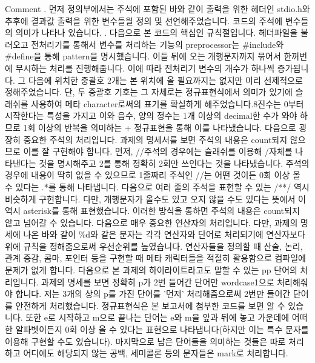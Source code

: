 \documentclass{article}
\begin{document}
Comment
. 먼저 정의부에서는 주석에 포함된 바와 같이 출력을 위한 헤더인 stdio.h와 추후에 결과값 출력을 위한 변수들읠 정의 및 선언해주었습니다. 코드의 주석에 변수들의 의미가 나타나 있습니다.
. 다음으로 본 코드의 핵심인 규칙절입니다. 헤더파일을 불러오고 전처리기를 통해서 변수를  처리하는 기능의 preprocessor는 #include와 #define을 통해 pattern을 명시했습니다. 이들 뒤에 오는 개행문자까지 묶어서 한꺼번에 무시하는 처리를 진행해줍니다. 이에 따라 전처리기 변수의 개수가 하나씩 증가됩니다. 그 다음에 위치한 중괄호 2개는 본 위치에 올 필요까지는 없지만 미리 선제적으로 정해주었습니다. 단, 두 중괄호 기호는 그 자체로는 정규표현식에서 의미가 있기에 슬래쉬를 사용하여 메타 character로써의 표기를 확실하게 해주었습니다.8진수는 0부터 시작한다는 특성을 가지고 이와 음수, 양의 정수는 1개 이상의 decimal한 수가 와야 하므로 1회 이상의 반복을 의미하는 + 정규표현을 통해 이를 나타냈습니다. 다음으로 굉장히 중요한 주석의 처리입니다. 과제의 명세서를 보면 주석의 내용은 count되지 않으므로 이를 잘 구현해야 합니다. 먼저, //주석의 경우에는 슬래쉬를 이용해 /자체를 나타낸다는 것을 명시해주고 {2}를 통해 정확히 2회만 쓰인다는 것을 나타냈습니다. 주석의 경우에 내용이 딱히 없을 수 있으므로 1줄짜리 주석인 //는 어떤 것이든 0회 이상 올 수 있다는 .*를 통해 나타냅니다. 다음으로 여러 줄의 주석을 표현할 수 있는 /**/ 역시 비슷하게 구현합니다. 다만, 개행문자가 올수도 있고 오지 않을 수도 있다는 뜻에서 이 역시 asterisk를 통해 표현했습니다. 이러한 방식을 통하면 주석의 내용은 count되지 않고 넘어갈 수 있습니다. 다음으로 매우 중요한 연산자의 처리입니다. 다만, 과제의 명세에 나온 바와 같이 \%d와 같은 문자는 각각 연산자와 단어로 처리되기에 연산자보다 위에 규칙을 정해줌으로써 우선순위를 높였습니다. 연산자들을 정의할 때 산술, 논리, 관계 증감, 콤마, 포인터 등을 구현할 때 메타 캐릭터들을 적절히 활용함으로 컴파일에 문제가 없게 합니다. 다음으로 본 과제의 하이라이트라고도 말할 수 있는 pp 단어의 처리입니다. 과제의 명세를 보면 정확히 p가 2번 들어간 단어만 wordcase1으로 처리해줘야 합니다. 저는 3개의 상의 p를 가진 단어를 '먼저' 처리해줌으로써 2번만 들어간 단어를 안전하게 처리했습니다. 정규표현식은 본 보고서에 첨부한 코드를 보면 알 수 있습니다. 또한 e로 시작하고 m으로 끝나는 단어는 e와 m을 앞과 뒤에 놓고 가운데에 어떠한 알파벳이든지 0회 이상 올 수 있다는 표현으로 나타냅니다(하지만 이는 특수 문자를 이용해 구현할 수도 있습니다). 마지막으로 남은 단어들을 의미하는 것들은 따로 처리하고 어디에도 해당되지 않는 공백, 세미콜론 등의 문자들은 mark로 처리합니다. 
\end{document}
